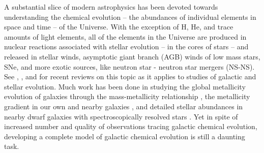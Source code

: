 A substantial slice of modern astrophysics has been devoted towards understanding the chemical evolution -- the abundances of individual elements in space and time -- of the Universe. With the exception of H, He, and trace amounts of light elements, all of the elements in the Universe are produced in nuclear reactions associated with stellar evolution -- in the cores of stars -- and released in stellar winds, asymptotic giant branch (AGB) winds of low mass stars, SNe, and more exotic sources, like neutron star - neutron star mergers (NS-NS). See \cite{Nomoto2013}, \cite{Thielmann2017}, and \cite{Frebel2018} for recent reviews on this topic as it applies to studies of galactic and stellar evolution. Much work has been done in studying the global metallicity evolution of galaxies through the mass-metallicity relationship \citep[e.g.][]{Lequeux1979,Tremonti2004,Lee2006,Zahid2012,AndrewsMartini2013}, the metallicity gradient in our own and nearby galaxies \citep[e.g.][]{Searle1971,Shaver1983,Belfiore2017,SanchezMenguiano2017}, and detailed stellar abundances in nearby dwarf galaxies with spectroscopically resolved stars \citep[see the review in][]{Tolstoy2009}. Yet in spite of increased number and quality of observations tracing galactic chemical evolution, developing a complete model of galactic chemical evolution is still a daunting task.

